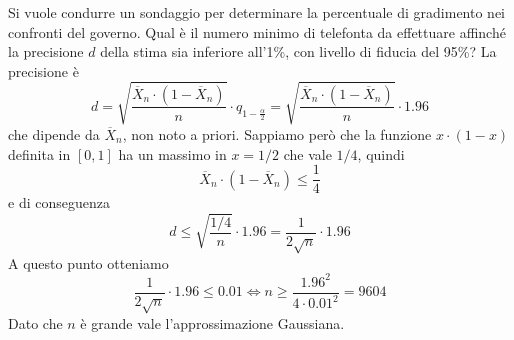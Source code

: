 \begin{example}
	Si vuole condurre un sondaggio per determinare la percentuale di gradimento nei confronti del
	governo. Qual è il numero minimo di telefonta da effettuare affinché la precisione $d$ della
	stima sia inferiore all'1\%, con livello di fiducia del 95\%? La precisione è
	\[
		d = \sqrt{\frac{\overline{X}_n \cdot (1 - \overline{X}_n)}{n}} \cdot
		q_{1 - \frac{\alpha}{2}} = \sqrt{\frac{\overline{X}_n \cdot (1 - \overline{X}_n)}{n}} \cdot
		1.96
	\]
	che dipende da $\overline{X}_n$, non noto a priori. Sappiamo però che la funzione
	$x \cdot (1-x)$ definita in $[0,1]$ ha un massimo in $x=1/2$ che vale $1/4$, quindi
	\[ \overline{X}_n \cdot (1 - \overline{X}_n) \leq \frac{1}{4} \]
	e di conseguenza
	\[
		d \leq \sqrt{\frac{1/4}{n}} \cdot 1.96 = \frac{1}{2 \sqrt{n}} \cdot 1.96
	\]
	A questo punto otteniamo
	\[
		\frac{1}{2 \sqrt{n}} \cdot 1.96 \leq 0.01 \iff
		n \geq \frac{1.96^2}{4 \cdot 0.01^2} = 9604
	\]
	Dato che $n$ è grande vale l'approssimazione Gaussiana.
\end{example}